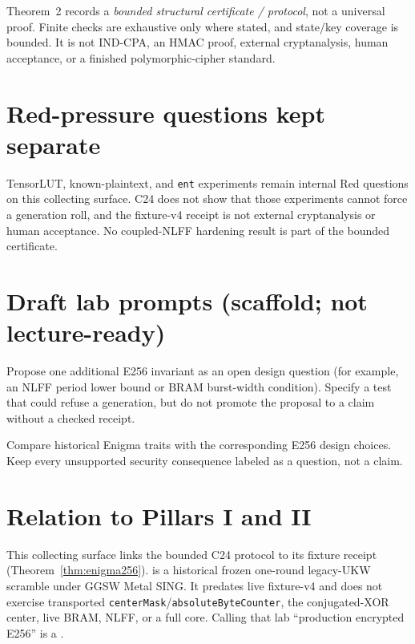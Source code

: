 \begin{warning}
Theorem~2 records a \emph{bounded structural certificate / protocol}, not a
universal proof. Finite checks are exhaustive only where stated, and state/key
coverage is bounded. It is not IND-CPA, an HMAC proof, external cryptanalysis,
human acceptance, or a finished polymorphic-cipher standard.
\end{warning}

\section{Red-pressure questions kept separate}

TensorLUT, known-plaintext, and \texttt{ent} experiments remain internal Red
questions on this collecting surface. C24 does not show that those experiments
cannot force a generation roll, and the fixture-v4 receipt is not external
cryptanalysis or human acceptance. No coupled-NLFF hardening result is part of
the bounded certificate.

\section{Draft lab prompts (scaffold; not lecture-ready)}

\begin{exercise}
Propose one additional E256 invariant as an open design question (for example,
an NLFF period lower bound or BRAM burst-width condition). Specify a test that
could refuse a generation, but do not promote the proposal to a claim without
a checked receipt.
\end{exercise}

\begin{exercise}
Compare historical Enigma traits with the corresponding E256 design choices.
Keep every unsupported security consequence labeled as a question, not a
claim.
\end{exercise}

\section{Relation to Pillars I and II}

This collecting surface links the bounded C24 protocol to its fixture receipt
(Theorem~\ref{thm:enigma256}).  is a historical frozen one-round
legacy-UKW scramble under GGSW Metal SING. It predates live fixture-v4 and does
not exercise transported \texttt{centerMask}/\texttt{absoluteByteCounter}, the
conjugated-XOR center, live BRAM, NLFF, or a full core. Calling that lab
``production encrypted E256'' is a .

